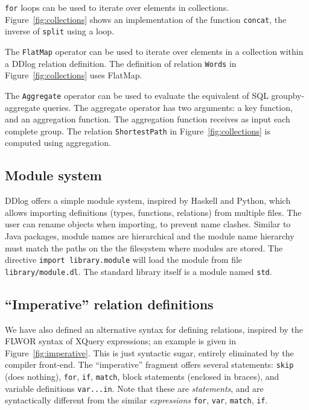 \texttt{for} loops can be used to iterate over elements in
collections.  Figure~\ref{fig:collections} shows an implementation of
the function \texttt{concat}, the inverse of \texttt{split} using a
loop.

The \texttt{FlatMap} operator can be used to iterate over elements in
a collection within a DDlog relation definition.  The definition of
relation \texttt{Words} in Figure~\ref{fig:collections} uses
FlatMap.

The \texttt{Aggregate} operator can be used to evaluate the equivalent
of SQL groupby-aggregate queries.  The aggregate operator has two
arguments: a key function, and an aggregation function.  The
aggregation function receives as input each complete group.  The
relation \texttt{ShortestPath} in Figure~\ref{fig:collections} is
computed using aggregation.

\subsection{Module system}

DDlog offers a simple module system, inspired by Haskell and Python,
which allows importing definitions (types, functions, relations) from
multiple files.  The user can rename objects when importing, to
prevent name clashes.  Similar to Java packages, module names are
hierarchical and the module name hierarchy must match the paths on the
the filesystem where modules are stored.  The directive \texttt{import
  library.module} will load the module from file
\texttt{library/module.dl}.  The standard library itself is a module
named \texttt{std}.

\subsection{``Imperative'' relation definitions}

We have also defined an alternative syntax for defining relations,
inspired by the FLWOR syntax of XQuery expressions; an example is
given in Figure~\ref{fig:imperative}.  This is just syntactic sugar,
entirely eliminated by the compiler front-end.  The ``imperative''
fragment offers several statements: \texttt{skip} (does nothing),
\texttt{for}, \texttt{if}, \texttt{match}, block statements (enclosed
in braces), and variable definitions \texttt{var...in}.  Note that
these are \emph{statements}, and are syntactically different from the
similar \emph{expressions} \texttt{for}, \texttt{var}, \texttt{match},
\texttt{if}.

